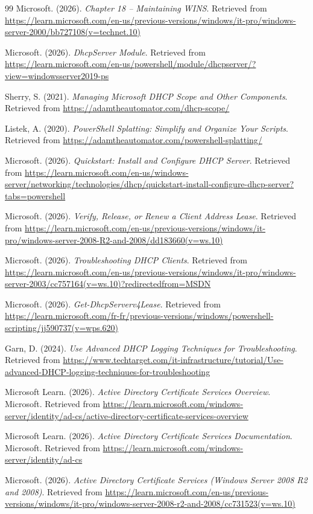 \documentclass[12pt,a4paper]{report}
\begin{document}
\begin{thebibliography}{99}
Microsoft. (2026). \textit{Chapter 18 -- Maintaining WINS}. Retrieved from \url{https://learn.microsoft.com/en-us/previous-versions/windows/it-pro/windows-server-2000/bb727108(v=technet.10)}

Microsoft. (2026). \textit{DhcpServer Module}. Retrieved from \url{https://learn.microsoft.com/en-us/powershell/module/dhcpserver/?view=windowsserver2019-ps}

Sherry, S. (2021). \textit{Managing Microsoft DHCP Scope and Other Components}. Retrieved from \url{https://adamtheautomator.com/dhcp-scope/}

Listek, A. (2020). \textit{PowerShell Splatting: Simplify and Organize Your Scripts}. Retrieved from \url{https://adamtheautomator.com/powershell-splatting/}

Microsoft. (2026). \textit{Quickstart: Install and Configure DHCP Server}. Retrieved from \url{https://learn.microsoft.com/en-us/windows-server/networking/technologies/dhcp/quickstart-install-configure-dhcp-server?tabs=powershell}

Microsoft. (2026). \textit{Verify, Release, or Renew a Client Address Lease}. Retrieved from \url{https://learn.microsoft.com/en-us/previous-versions/windows/it-pro/windows-server-2008-R2-and-2008/dd183660(v=ws.10)}

Microsoft. (2026). \textit{Troubleshooting DHCP Clients}. Retrieved from \url{https://learn.microsoft.com/en-us/previous-versions/windows/it-pro/windows-server-2003/cc757164(v=ws.10)?redirectedfrom=MSDN}

Microsoft. (2026). \textit{Get-DhcpServerv4Lease}. Retrieved from \url{https://learn.microsoft.com/fr-fr/previous-versions/windows/powershell-scripting/jj590737(v=wps.620)}

Garn, D. (2024). \textit{Use Advanced DHCP Logging Techniques for Troubleshooting}. Retrieved from \url{https://www.techtarget.com/it-infrastructure/tutorial/Use-advanced-DHCP-logging-techniques-for-troubleshooting}


Microsoft Learn. (2026). \textit{Active Directory Certificate Services Overview}. Microsoft. Retrieved from \url{https://learn.microsoft.com/windows-server/identity/ad-cs/active-directory-certificate-services-overview}

Microsoft Learn. (2026). \textit{Active Directory Certificate Services Documentation}. Microsoft. Retrieved from \url{https://learn.microsoft.com/windows-server/identity/ad-cs}

Microsoft. (2026). \textit{Active Directory Certificate Services (Windows Server 2008 R2 and 2008)}. Retrieved from \url{https://learn.microsoft.com/en-us/previous-versions/windows/it-pro/windows-server-2008-r2-and-2008/cc731523(v=ws.10)}

\end{thebibliography}
\end{document}
